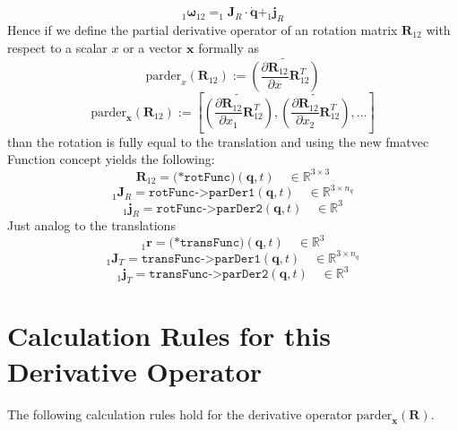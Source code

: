 \documentclass{article}
\newcommand{\bs}[1]{\boldsymbol #1}
\begin{document}
\begin{equation}
_1\bs{\omega}_{12}=_1\bs{J}_R\cdot \dot{\bs{q}} + _1\bs{j}_R
\end{equation}
Hence if we define the partial derivative operator of an rotation matrix $\bs{R}_{12}$ with respect to a scalar $x$ or a vector $\bs{x}$ formally as
\begin{equation}
\text{parder}_x(\bs{R}_{12}):=\widetilde{\left(\frac{\partial\bs{R}_{12}}{\partial x}\bs{R}_{12}^T\right)}
\end{equation}
\begin{equation}
\text{parder}_{\bs{x}}(\bs{R}_{12}):=\left[\widetilde{\left(\frac{\partial\bs{R}_{12}}{\partial x_1}\bs{R}_{12}^T\right)},\widetilde{\left(\frac{\partial\bs{R}_{12}}{\partial x_2}\bs{R}_{12}^T\right)},\dots\right]
\end{equation}
than the rotation is fully equal to the translation and using the new fmatvec Function concept yields the following:
\begin{equation}
\bs{R}_{12}=\texttt{(*rotFunc)}(\bs{q},t)\quad\in\mathbb{R}^{3\times 3}
\end{equation}
\begin{equation}
_1\bs{J}_R=\texttt{rotFunc->parDer1}(\bs{q},t)\quad\in\mathbb{R}^{3\times n_q}
\end{equation}
\begin{equation}
_1\bs{j}_R=\texttt{rotFunc->parDer2}(\bs{q},t)\quad\in\mathbb{R}^3
\end{equation}
Just analog to the translations
\begin{equation}
_1\bs{r}=\texttt{(*transFunc)}(\bs{q},t)\quad\in\mathbb{R}^3
\end{equation}
\begin{equation}
_1\bs{J}_T=\texttt{transFunc->parDer1}(\bs{q},t)\quad\in\mathbb{R}^{3\times n_q}
\end{equation}
\begin{equation}
_1\bs{j}_T=\texttt{transFunc->parDer2}(\bs{q},t)\quad\in\mathbb{R}^3
\end{equation}

\section{Calculation Rules for this Derivative Operator}

The following calculation rules hold for the derivative operator $\text{parder}_{\bs{x}}(\bs{R})$.
\end{document}
